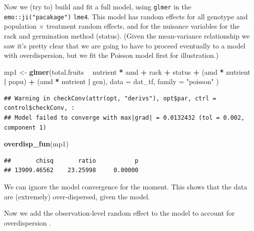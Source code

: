 \documentclass[
  12pt,
]{book}
\newenvironment{Shaded}{\begin{snugshade}}{\end{snugshade}}
\newcommand{\DataTypeTok}[1]{\textcolor[rgb]{0.13,0.29,0.53}{#1}}
\newcommand{\KeywordTok}[1]{\textcolor[rgb]{0.13,0.29,0.53}{\textbf{#1}}}
\newcommand{\NormalTok}[1]{#1}
\newcommand{\OperatorTok}[1]{\textcolor[rgb]{0.81,0.36,0.00}{\textbf{#1}}}
\newcommand{\StringTok}[1]{\textcolor[rgb]{0.31,0.60,0.02}{#1}}
\begin{document}
Now we (try to) build and fit a full model, using \texttt{glmer} in the \texttt{emo::ji("pacakage")} \texttt{lme4}. This model has random effects for all genotype and population × treatment random effects, and for the nuisance variables for the rack and germination method (status). (Given the mean-variance relationship we saw it's pretty clear that we are going to have to proceed eventually to a model with overdispersion, but we fit the Poisson model first for illustration.)

\begin{Shaded}
\begin{Highlighting}[]
\NormalTok{mp1 <-}\StringTok{ }\KeywordTok{glmer}\NormalTok{(total.fruits }\OperatorTok{~}\StringTok{ }\NormalTok{nutrient }\OperatorTok{*}\StringTok{ }\NormalTok{amd }\OperatorTok{+}
\StringTok{  }\NormalTok{rack }\OperatorTok{+}\StringTok{ }\NormalTok{status }\OperatorTok{+}
\StringTok{  }\NormalTok{(amd }\OperatorTok{*}\StringTok{ }\NormalTok{nutrient }\OperatorTok{|}\StringTok{ }\NormalTok{popu) }\OperatorTok{+}
\StringTok{  }\NormalTok{(amd }\OperatorTok{*}\StringTok{ }\NormalTok{nutrient }\OperatorTok{|}\StringTok{ }\NormalTok{gen),}
\DataTypeTok{data =}\NormalTok{ dat_tf, }\DataTypeTok{family =} \StringTok{"poisson"}
\NormalTok{)}
\end{Highlighting}
\end{Shaded}

\begin{verbatim}
## Warning in checkConv(attr(opt, "derivs"), opt$par, ctrl = control$checkConv, :
## Model failed to converge with max|grad| = 0.0132432 (tol = 0.002, component 1)
\end{verbatim}

\begin{Shaded}
\begin{Highlighting}[]
\KeywordTok{overdisp_fun}\NormalTok{(mp1)}
\end{Highlighting}
\end{Shaded}

\begin{verbatim}
##       chisq       ratio           p 
## 13909.46562    23.25998     0.00000
\end{verbatim}

We can ignore the model convergence for the moment. This shows that the data are (extremely) over-dispersed, given the model.

Now we add the observation-level random effect to the model to account for overdispersion \citep{elston2001}.
\end{document}
